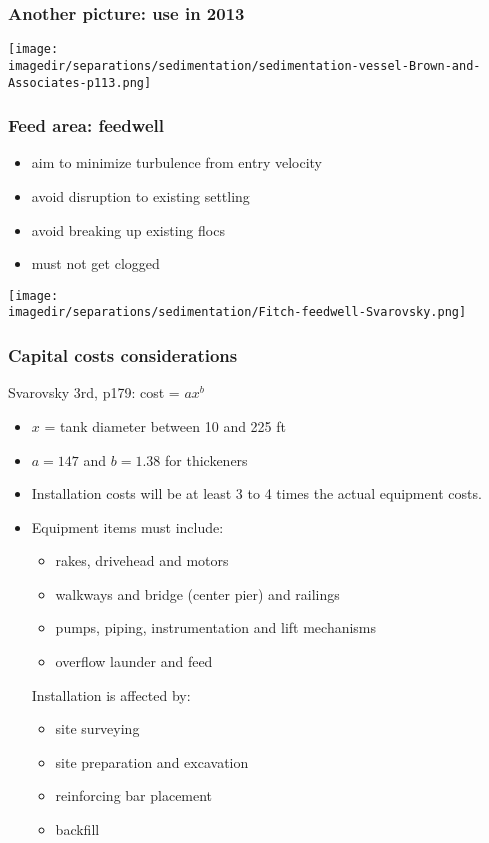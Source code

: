 \begin{frame}\frametitle{Another picture: use in 2013}
	\begin{center}
		\texttt{[image: \\imagedir/separations/sedimentation/sedimentation-vessel-Brown-and-Associates-p113.png]}
	\end{center}
\end{frame}

\begin{frame}\frametitle{Feed area: feedwell}
	\begin{itemize}
		\item	aim to minimize turbulence from entry velocity
		\item	avoid disruption to existing settling
		\item	avoid breaking up existing flocs
		\item	must not get clogged
	\end{itemize}
	
	\begin{center}
		\texttt{[image: \\imagedir/separations/sedimentation/Fitch-feedwell-Svarovsky.png]}
	\end{center}
\end{frame}

\begin{frame}\frametitle{Capital costs considerations}
	Svarovsky 3rd, p179: cost = $a x^b$
	\begin{itemize}
		\item	$x$ = tank diameter between 10 and 225 ft
		\item	$a=147$ and $b=1.38$ for thickeners
	\end{itemize}
	
	\begin{itemize}
		\item	Installation costs will be at least 3 to 4 times the actual equipment costs.
		\item	Equipment items must include:
		\begin{itemize}
			\item	rakes, drivehead and motors
			\item	walkways and bridge (center pier) and railings
			\item	pumps, piping, instrumentation and lift mechanisms
			\item	overflow launder and feed 
		\end{itemize}
		Installation is affected by:
		\begin{itemize}			
			\item	site surveying
			\item	site preparation and excavation 
			\item	reinforcing bar placement 
			\item	backfill			
		\end{itemize}		
	\end{itemize}	
\end{frame}

